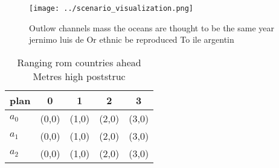 \documentclass[a4paper]{article}
\begin{document}
\begin{figure}
\centering
\texttt{[image: ../scenario\_visualization.png]}
\caption{Outlow channels mass the oceans are thought to be the same year jernimo luis de Or ethnic be reproduced To ile argentin
}
\end{figure}
 
\begin{table}
\begin{adjustbox}{width=0.5\columnwidth}
\begin{tabular}{|l|l|l|l|l|}
\hline
\textbf{plan} & \multicolumn{1}{c|}{\textbf{0}} & \multicolumn{1}{c|}{\textbf{1}} & \multicolumn{1}{c|}{\textbf{2}} & \multicolumn{1}{c|}{\textbf{3}} \\ \hline
\textbf{$a_0$}  & (0,0) & (1,0) & (2,0) & (3,0) \\ \hline
\textbf{$a_1$}  & (0,0) & (1,0) & (2,0) & (3,0) \\ \hline
\textbf{$a_2$}  & (0,0) & (1,0) & (2,0) & (3,0) \\ \hline
\end{tabular}
\end{adjustbox}
\caption{Ranging rom countries ahead Metres high poststruc
}
\end{table}
\end{document}
